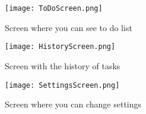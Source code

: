 \begin{figure}[h]
	\centering
	\texttt{[image: ToDoScreen.png]}
	\caption{Screen where you can see to do list}\label{toDoScreen}
	\endminipage\hfill
	\centering
	\texttt{[image: HistoryScreen.png]}
	\caption{Screen with the history of tasks}\label{historyScreen}
	\endminipage\hfill
	\centering
	\texttt{[image: SettingsScreen.png]}
	\caption{Screen where you can change settings}\label{settingsScreen}
	\endminipage\hfill
\end{figure}